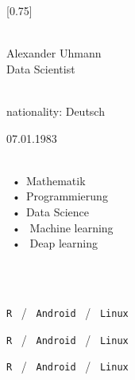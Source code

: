 \documentclass[lighthipster]{hipstercv}
\begin{document}
\setlength{\columnsep}{1.5cm}
[0.75]
\begin{paracol}{2}

\paracolbackgroundoptions



\footnotesize
{\setasidefontcolour
\flushright
\begin{center}
\end{center}

\\[0.5em]
Alexander Uhmann\\
Data Scientist

\bigskip

 \\[0.5em]

nationality: Deutsch 

07.01.1983

\bigskip

 \\[0.5em]

~•~Mathematik \\
~•~Programmierung\\

~•~Data Science\\ 
~•~ Machine learning\\ 
~•~ Deap learning

\bigskip



\bigskip

\\[0.5em]

\bigskip

\\[0.5em]

\texttt{R} ~/~ \texttt{Android} ~/~ \texttt{Linux}

\texttt{R} ~/~ \texttt{Android} ~/~ \texttt{Linux}

\texttt{R} ~/~ \texttt{Android} ~/~ \texttt{Linux}

\vspace{4em}


}
\end{paracol}
\end{document}
